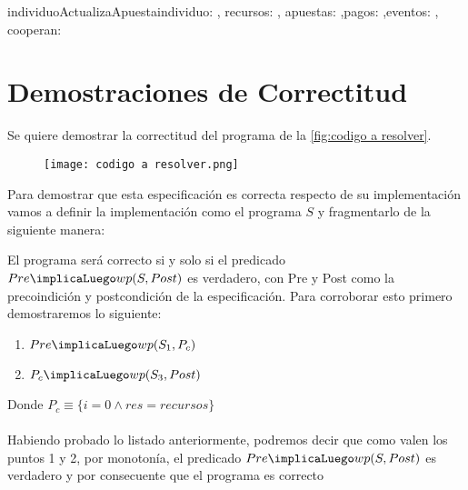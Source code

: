 \documentclass[10pt,a4paper]{article}
\begin{document}
\begin{proc}{individuoActualizaApuesta}{\In individuo: \nat, \In recursos: \TLista{\float}, \Inout apuestas: \TLista{\TLista{\float}},\In pagos: \TLista{\TLista{\float}},\In eventos: \TLista{\ent}, \In cooperan: \TLista{\bool}}{}{}
\end{proc}

\clearpage
\section{Demostraciones de Correctitud}

Se quiere demostrar la correctitud del programa de la \autoref{fig:codigo a resolver}. 

\begin{figure}[H]
    \centering
    \texttt{[image: codigo a resolver.png]}
    \caption{}
    \label{fig:codigo a resolver}
\end{figure}
Para demostrar que esta especificación es correcta respecto de su implementación vamos a definir la implementación como el programa $S$ y fragmentarlo de la siguiente manera:
\begin{itemize} \setlength\itemsep{0cm}
    \item{S_1 \equiv $\lbrace$
  	\begin{lstlisting}[label=code:s1]
res = recursos;
i = 0;
	\end{lstlisting} 
 }$\rbrace$
    \item{S_2 \equiv $\lbrace$
  	\begin{lstlisting}[label=code:s2]
if eventos[i] then
    res = (res * apuesta.c) * pago.c
else
    res = (res * apuesta.s) * pago.s
endif
i = i + 1
	\end{lstlisting} 
     \item{S_3 \equiv $\lbrace$
  	\begin{lstlisting}[label=code:s]
while (i < |eventos|) do 
   S2;
endwhile
	\end{lstlisting} 
 }$\rbrace$
\end{itemize}\textbf{}
El programa será correcto si y solo si el predicado $Pre \implicaLuego wp(S, Post)$ es verdadero, con Pre y Post como la precoindición y postcondición de la especificación. Para corroborar esto primero demostraremos lo siguiente:
\begin{enumerate} \setlength\itemsep{0cm}
	\item $Pre\implicaLuego wp(S_1, P_c)$
    \item $P_c\implicaLuego wp(S_3, Post)$
\end{enumerate}
Donde $P_c \equiv \lbrace i=0 \land res = recursos\rbrace$\\\\
Habiendo probado lo listado anteriormente, podremos decir que como valen los puntos 1 y 2, por monotonía, el predicado $Pre \implicaLuego wp(S, Post)$ es verdadero y por consecuente que el programa es correcto
\clearpage
\end{document}
